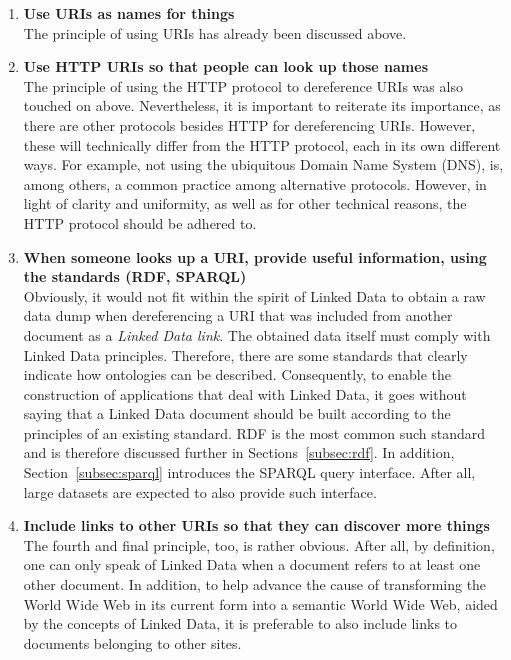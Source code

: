 \begin{enumerate}

    \item \textbf{Use URIs as names for things}\\
    The principle of using URIs has already been discussed above.
    
    \item \textbf{Use HTTP URIs so that people can look up those names}\\
    The principle of using the HTTP protocol to dereference URIs was also touched on above. Nevertheless, it is important to reiterate its importance, as there are other protocols besides HTTP for dereferencing URIs. However, these will technically differ from the HTTP protocol, each in its own different ways. For example, not using the ubiquitous Domain Name System (DNS), is, among others, a common practice among alternative protocols. However, in light of clarity and uniformity, as well as for other technical reasons, the HTTP protocol should be adhered to. \citep{berners2006linked}
    
    \item \textbf{When someone looks up a URI, provide useful information, using the standards (RDF, SPARQL)}\\
    Obviously, it would not fit within the spirit of Linked Data to obtain a raw data dump when dereferencing a URI that was included from another document as a \textit{Linked Data link}. The obtained data itself must comply with Linked Data principles. Therefore, there are some standards that clearly indicate how ontologies can be described. Consequently, to enable the construction of applications that deal with Linked Data, it goes without saying that a Linked Data document should be built according to the principles of an existing standard. RDF is the most common such standard and is therefore discussed further in Sections~\ref{subsec:rdf}. In addition, Section~\ref{subsec:sparql} introduces the SPARQL query interface. After all, large datasets are expected to also provide such interface. \citep{berners2006linked}
    
    \item \textbf{Include links to other URIs so that they can discover more things}\\
    The fourth and final principle, too, is rather obvious. After all, by definition, one can only speak of Linked Data when a document refers to at least one other document. In addition, to help advance the cause of transforming the World Wide Web in its current form into a semantic World Wide Web, aided by the concepts of Linked Data, it is preferable to also include links to documents belonging to other sites. \citep{berners2006linked}
    
\end{enumerate}

